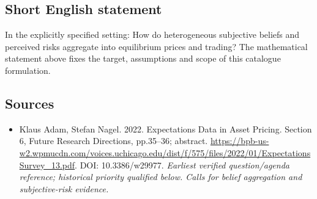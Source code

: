\documentclass[11pt]{article}
\begin{document}
\subsection{Short English statement}
In the explicitly specified setting: How do heterogeneous subjective beliefs and perceived risks aggregate into equilibrium prices and trading? The mathematical statement above fixes the target, assumptions and scope of this catalogue formulation.

\subsection{Sources}
\begin{itemize}\raggedright
\item[\textnormal{[S1]}]\hypertarget{source:30007595:1}{} Klaus Adam, Stefan Nagel. 2022. Expectations Data in Asset Pricing. Section 6, Future Research Directions, pp.35–36; abstract.
\url{https://bpb-us-w2.wpmucdn.com/voices.uchicago.edu/dist/f/575/files/2022/01/ExpectationsSurvey_13.pdf}.
DOI: 10.3386/w29977.
{\small\textit{Earliest verified question/agenda reference; historical priority qualified below. Calls for belief aggregation and subjective-risk evidence.}}
\end{itemize}
\end{document}
